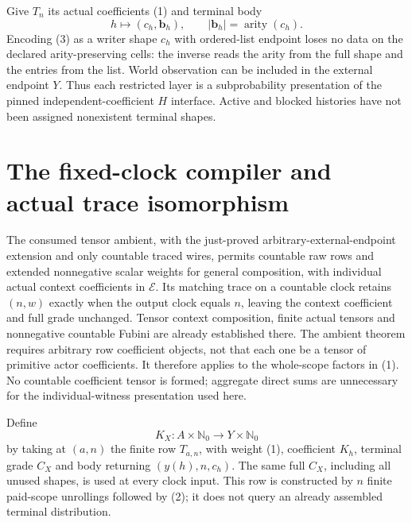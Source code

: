 \documentclass[11pt]{article}\usepackage{amsmath,amssymb,amsthm,geometry}\geometry{margin=1in}\newtheorem{definition}{Definition}\newtheorem{theorem}[definition]{Theorem}\newtheorem{proposition}[definition]{Proposition}
\begin{document}
Give $T_n$ its actual coefficients (1) and terminal body
\[
                     h\longmapsto (c_h,\mathbf b_h),
          \qquad |\mathbf b_h|=\operatorname{arity}(c_h).     \tag{3}
\]
Encoding (3) as a writer shape $c_h$ with ordered-list endpoint loses no data on the declared arity-preserving cells: the inverse reads the arity from the full shape and the entries from the list. World observation can be included in the external endpoint $Y$. Thus each restricted layer is a subprobability presentation of the pinned independent-coefficient $H$ interface. Active and blocked histories have not been assigned nonexistent terminal shapes.

\section{The fixed-clock compiler and actual trace isomorphism}
The consumed tensor ambient, with the just-proved arbitrary-external-endpoint extension and only countable traced wires, permits countable raw rows and extended nonnegative scalar weights for general composition, with individual actual context coefficients in $\mathcal E$. Its matching trace on a countable clock retains $(n,w)$ exactly when the output clock equals $n$, leaving the context coefficient and full grade unchanged. Tensor context composition, finite actual tensors and nonnegative countable Fubini are already established there. The ambient theorem requires arbitrary row coefficient objects, not that each one be a tensor of primitive actor coefficients. It therefore applies to the whole-scope factors in (1). No countable coefficient tensor is formed; aggregate direct sums are unnecessary for the individual-witness presentation used here.

Define
\[
 K_X:A\times\mathbb N_0\longrightarrow Y\times\mathbb N_0
\]
by taking at $(a,n)$ the finite row $T_{a,n}$, with weight (1), coefficient $K_h$, terminal grade $C_X$ and body returning $(y(h),n,c_h)$. The same full $C_X$, including all unused shapes, is used at every clock input. This row is constructed by $n$ finite paid-scope unrollings followed by (2); it does not query an already assembled terminal distribution.
\end{document}
